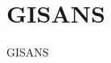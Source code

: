 \documentclass[\main/dresen_thesis.tex]{subfiles}
\begin{document}
  \section{GISANS}
    \label{app:methods:gisans}
    GISANS
\end{document}
